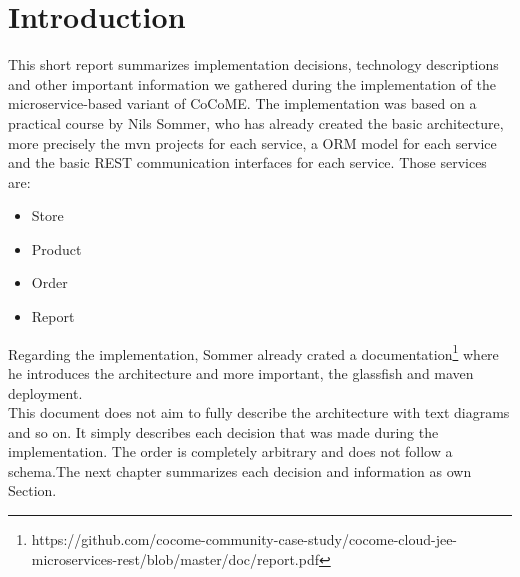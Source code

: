 \chapter{Introduction}
\label{ch:Introduction}

This short report summarizes implementation decisions, technology descriptions and other important information we gathered during the implementation of the microservice-based variant of CoCoME. The implementation was based on a practical course by Nils Sommer, who has already created the basic architecture, more precisely the mvn projects for each service, a ORM model for each service and the basic REST communication interfaces for each service. Those services are:

\begin{itemize}
	\item Store
	\item Product
	\item Order
	\item Report
\end{itemize}

\noindent
Regarding the implementation, Sommer already crated a documentation\footnote{https://github.com/cocome-community-case-study/cocome-cloud-jee-microservices-rest/blob/master/doc/report.pdf} where he introduces the architecture and more important, the glassfish and maven deployment. \\

This document does not aim to fully describe the architecture with text diagrams and so on. It simply describes each decision that was made during the implementation. The order is completely arbitrary and does not follow a schema.The next chapter summarizes each decision and information as own Section. 